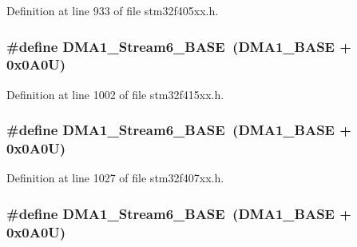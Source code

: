 Definition at line 933 of file stm32f405xx.\+h.

\subsubsection[{\texorpdfstring{D\+M\+A1\+\_\+\+Stream6\+\_\+\+B\+A\+SE}{DMA1_Stream6_BASE}}]{\setlength{\rightskip}{0pt plus 5cm}\#define D\+M\+A1\+\_\+\+Stream6\+\_\+\+B\+A\+SE~({\bf D\+M\+A1\+\_\+\+B\+A\+SE} + 0x0\+A0\+U)}\hypertarget{group___peripheral__registers__structures_ga58998ddc40adb6361704d6c9dad08125}{}\label{group___peripheral__registers__structures_ga58998ddc40adb6361704d6c9dad08125}


Definition at line 1002 of file stm32f415xx.\+h.

\subsubsection[{\texorpdfstring{D\+M\+A1\+\_\+\+Stream6\+\_\+\+B\+A\+SE}{DMA1_Stream6_BASE}}]{\setlength{\rightskip}{0pt plus 5cm}\#define D\+M\+A1\+\_\+\+Stream6\+\_\+\+B\+A\+SE~({\bf D\+M\+A1\+\_\+\+B\+A\+SE} + 0x0\+A0\+U)}\hypertarget{group___peripheral__registers__structures_ga58998ddc40adb6361704d6c9dad08125}{}\label{group___peripheral__registers__structures_ga58998ddc40adb6361704d6c9dad08125}


Definition at line 1027 of file stm32f407xx.\+h.

\subsubsection[{\texorpdfstring{D\+M\+A1\+\_\+\+Stream6\+\_\+\+B\+A\+SE}{DMA1_Stream6_BASE}}]{\setlength{\rightskip}{0pt plus 5cm}\#define D\+M\+A1\+\_\+\+Stream6\+\_\+\+B\+A\+SE~({\bf D\+M\+A1\+\_\+\+B\+A\+SE} + 0x0\+A0\+U)}\hypertarget{group___peripheral__registers__structures_ga58998ddc40adb6361704d6c9dad08125}{}\label{group___peripheral__registers__structures_ga58998ddc40adb6361704d6c9dad08125}


